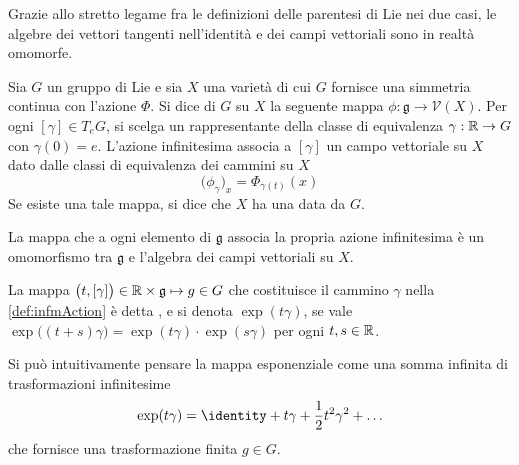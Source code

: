 Grazie allo stretto legame fra le definizioni delle parentesi di Lie nei due casi, le algebre dei vettori tangenti nell'identità e dei campi vettoriali sono in realtà omomorfe.

\begin{definition} \label{def:infmAction}
  Sia $G$ un gruppo di Lie e sia $X$ una varietà di cui $G$ fornisce una simmetria continua con l'azione $\Phi$. Si dice  di $G$ su $X$ la seguente mappa $\phi: \mathfrak{g} \to \mathcal{V}(X)$. Per ogni $[\gamma] \in T_e G$, si scelga un rappresentante della classe di equivalenza $\gamma:\mathbb{R}\to G$ con $\gamma(0) = e$. L'azione infinitesima associa a $[\gamma]$ un campo vettoriale su $X$ dato dalle classi di equivalenza dei cammini su $X$
  \begin{equation*}
  \big(\phi_{\gamma}\big)_x = \Phi_{\gamma(t)} (x)
  \end{equation*}
  Se esiste una tale mappa, si dice che $X$ ha una  data da $G$.
\end{definition}
\begin{theorem}
  La mappa che a ogni elemento di $\mathfrak{g}$ associa la propria azione infinitesima è un omomorfismo tra $\mathfrak{g}$ e l'algebra dei campi vettoriali su $X$.
\end{theorem}
\begin{definition}
  La mappa $\big(t, [\gamma]\big) \in \mathbb{R} \times  \mathfrak{g} \mapsto g \in G$ che costituisce il cammino $\gamma$ nella \autoref{def:infmAction} è detta , e si denota $\exp(t \gamma)$, se vale $\exp\big((t+s) \gamma\big) = \exp(t \gamma) \cdot  \exp (s \gamma)$ per ogni $t,s \in \mathbb{R}$.
\end{definition}
\begin{remark}
  Si può intuitivamente pensare la mappa esponenziale come una somma infinita di trasformazioni infinitesime
  \begin{equation*}
  \exp(t \gamma) = \identity + t \gamma + \frac{1}{2} t^2 \gamma^2 + \ldots
  \end{equation*} 
  che fornisce una trasformazione finita $g \in G$.
\end{remark} 

